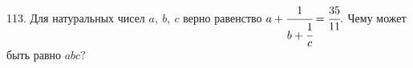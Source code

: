 113. Для натуральных чисел $a,\ b,\ c$ верно равенство $a+\cfrac{1}{b+\cfrac{1}{c}}=\cfrac{35}{11}.$ Чему может быть равно $abc?$\\
